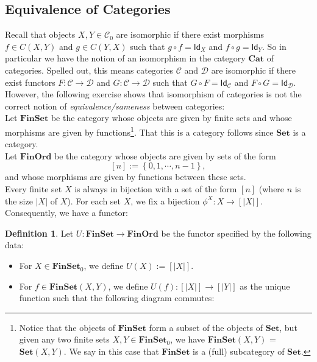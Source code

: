 \documentclass[a4paper,10pt]{scrartcl}
\theoremstyle{plain}
\theoremstyle{definition}
\newtheorem{dfn}[thm]{Definition}
\newcommand{\cfont}[1]{\ensuremath{\mathsf{#1}}}
\newcommand{\Cat}[1]{\mathcal{#1}}
\newcommand{\CC}{\Cat{C}}
\newcommand{\DD}{\Cat{D}}
\newcommand{\Catb}[1]{\mathbf{#1}}
\newcommand{\SET}{\Catb{Set}}
\newcommand{\FINSET}{\Catb{FinSet}}
\newcommand{\CAT}{\Catb{Cat}}
\newcommand{\Ob}[1]{{#1}_0}
\newcommand{\CHom}[3]{{#1}(#2,#3)}
\newcommand{\Id}[1][]{\cfont{Id}_{#1}}
\newcommand{\co}[2]{\ensuremath{#2 \circ #1}}
\begin{document}
\subsection{Equivalence of Categories}
Recall that objects $X,Y\in\Ob{\CC}$ are isomorphic if there exist morphisms $f\in\CHom{C}{X}{Y}$ and $g\in\CHom{C}{Y}{X}$ such that $\co{f}{g} = \Id[X]$ and $\co{g}{f} = \Id[Y]$. So in particular we have the notion of an isomorphism in the category $\CAT$ of categories. Spelled out, this means categories $\CC$ and $\DD$ are isomorphic if there exist functors $F:\CC\to\DD$ and $G:\CC\to\DD$ such that $\co{F}{G}= \Id[\CC]$ and $\co{G}{F} = \Id[\DD]$.\\
However, the following exercise shows that isomorphism of categories is not the correct notion of \textit{equivalence/sameness} between categories:\\
Let $\FINSET$ be the category whose objects are given by finite sets and whose morphisms are given by functions\footnote{Notice that the objects of $\FINSET$ form a subset of the objects of $\SET$, but given any two finite sets $X,Y \in \Ob{\FINSET}$, we have $\CHom{\FINSET}{X}{Y}$ = $\CHom{\SET}{X}{Y}$. We say in this case that $\FINSET$ is a (full) subcategory of $\SET$.}. That this is a category follows since $\SET$ is a category.\\
Let $\Catb{FinOrd}$ be the category whose objects are given by sets of the form 
\[
[n] := \left\{0,1,\cdots,n-1\right\},
\]
and whose morphisms are given by functions between these sets.\\
Every finite set $X$ is always in bijection with a set of the form $[n]$ (where $n$ is the size $\vert X\vert$ of $X$). For each set $X$, we fix a bijection $\phi^X: X\to [\vert X\vert]$. Consequently, we have a functor:
\begin{dfn} Let $U: \FINSET\to \Catb{FinOrd}$ be the functor specified by the following data:
\begin{itemize}
\item For $X\in \Ob{\FINSET}$, we define $U(X) := [\vert X\vert]$.
\item For $f\in \CHom{\FINSET}{X}{Y}$, we define $U(f): [\vert X\vert]\to [\vert Y\vert]$ as the unique function such that the following diagram commutes:
\begin{center}
\end{center}
\end{itemize}
\end{dfn}
\end{document}
